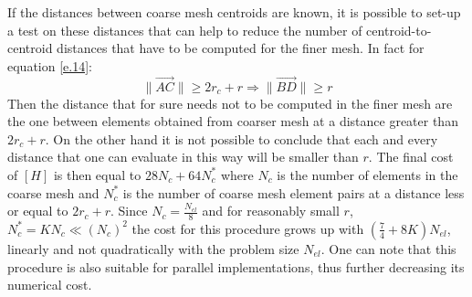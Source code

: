   If the distances between coarse mesh centroids are known, it is possible to set-up a test on these distances that can help to reduce the number of centroid-to-centroid distances that have to be computed for the finer mesh.
  In fact for equation \ref{e.14}:
   \begin{equation}
    \label{e.15}
     \|\vec{AC}\|\geq 2r_{c}+r \Rightarrow\| \vec{BD}\|\geq r
    \end{equation}
   Then the distance that for sure needs not to be computed in the finer mesh are the one between elements obtained from coarser mesh at a distance greater than $2r_{c}+r$. On the other hand it is not possible to conclude that each and every distance that one can evaluate in this way will be smaller than $r$. The final cost of $\left[H\right]$ is then equal to $28N_c+64N_c^*$ where $N_c$ is the number of elements in the coarse mesh and $N_c^*$ is the number of coarse mesh element pairs at a distance less or equal to $ 2r_{c}+r$. Since $N_c=\frac{N_{el}}{8}$ and for reasonably small $r$, $N_c^*=KN_c \ll (N_c)^2$ the cost for this procedure grows up with $(\frac{7}{4}+8K)N_{el}$, linearly and not quadratically with the problem size $N_{el}$. One can note that this procedure is also suitable for parallel implementations, thus further decreasing its numerical cost.
   \newpage
